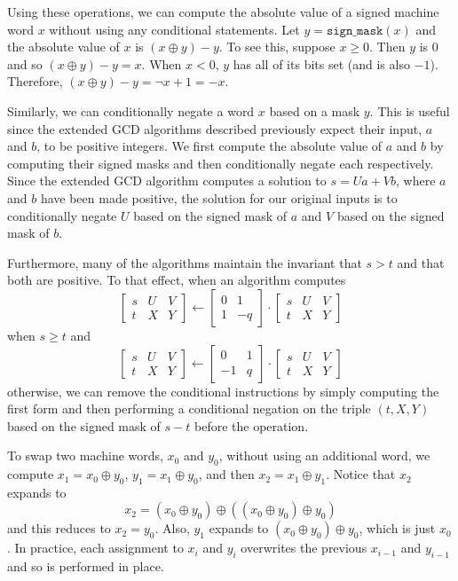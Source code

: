 \documentclass{ucalgthes1}
\theoremstyle{definition}
\newcommand{\matrixtt}[4]{\left[ \begin{array}{rr} #1 & #2 \\ #3 & #4 \end{array} \right]}
\newcommand{\matrixThreeTwo}[6]{\left[ \begin{array}{rrr} #1 & #2 & #3 \\ #4 & #5 & #6 \end{array} \right]}
\begin{document}
Using these operations, we can compute the absolute value of a signed machine word $x$ without using any conditional statements.  Let $y = \texttt{sign\_mask}(x)$ and the absolute value of $x$ is $(x \oplus y) - y$.  To see this, suppose $x \ge 0$.  Then $y$ is 0 and so $(x \oplus y) - y = x$.  When $x < 0$, $y$ has all of its bits set (and is also $-1$).  Therefore, $(x \oplus y) - y = \lnot x + 1 = -x$.

Similarly, we can conditionally negate a word $x$ based on a mask $y$.  This is useful since the extended GCD algorithms described previously expect their input, $a$ and $b$, to be positive integers.  We first compute the absolute value of $a$ and $b$ by computing their signed masks and then conditionally negate each respectively.  Since the extended GCD algorithm computes a solution to $s = Ua + Vb$, where $a$ and $b$ have been made positive, the solution for our original inputs is to conditionally negate $U$ based on the signed mask of $a$ and $V$ based on the signed mask of $b$.

Furthermore, many of the algorithms maintain the invariant that $s > t$ and that both are positive.  To that effect, when an algorithm computes
\[
 \matrixThreeTwo{s}{U}{V}{t}{X}{Y} \gets \matrixtt{0}{1}{1}{-q} \cdot \matrixThreeTwo{s}{U}{V}{t}{X}{Y}
\]
when $s \ge t$ and
\[
\matrixThreeTwo{s}{U}{V}{t}{X}{Y} \gets \matrixtt{0}{1}{-1}{q} \cdot \matrixThreeTwo{s}{U}{V}{t}{X}{Y}
\]
otherwise, we can remove the conditional instructions by simply computing the first form and then performing a conditional negation on the triple $(t, X, Y)$ based on the signed mask of $s-t$ before the operation.

To swap two machine words, $x_0$ and $y_0$, without using an additional word, we compute $x_1 = x_0 \oplus y_0$, $y_1 = x_1 \oplus y_0$, and then $x_2 = x_1 \oplus y_1$.  Notice that $x_2$ expands to
\[
	x_2 = (x_0 \oplus y_0) \oplus ((x_0 \oplus y_0) \oplus y_0)
\]
and this reduces to $x_2 = y_0$.  Also, $y_1$ expands to $(x_0 \oplus y_0) \oplus y_0$, which is just $x_0$.  In practice, each assignment to $x_i$ and $y_i$ overwrites the previous $x_{i-1}$ and $y_{i-1}$ and so is performed in place.
\end{document}
